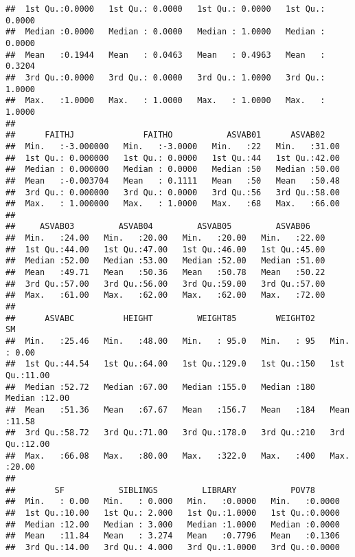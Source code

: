 \documentclass[
]{article}
\begin{document}
\begin{verbatim}
##  1st Qu.:0.0000   1st Qu.: 0.0000   1st Qu.: 0.0000   1st Qu.: 0.0000  
##  Median :0.0000   Median : 0.0000   Median : 1.0000   Median : 0.0000  
##  Mean   :0.1944   Mean   : 0.0463   Mean   : 0.4963   Mean   : 0.3204  
##  3rd Qu.:0.0000   3rd Qu.: 0.0000   3rd Qu.: 1.0000   3rd Qu.: 1.0000  
##  Max.   :1.0000   Max.   : 1.0000   Max.   : 1.0000   Max.   : 1.0000  
##                                                                        
##      FAITHJ              FAITHO           ASVAB01      ASVAB02     
##  Min.   :-3.000000   Min.   :-3.0000   Min.   :22   Min.   :31.00  
##  1st Qu.: 0.000000   1st Qu.: 0.0000   1st Qu.:44   1st Qu.:42.00  
##  Median : 0.000000   Median : 0.0000   Median :50   Median :50.00  
##  Mean   :-0.003704   Mean   : 0.1111   Mean   :50   Mean   :50.48  
##  3rd Qu.: 0.000000   3rd Qu.: 0.0000   3rd Qu.:56   3rd Qu.:58.00  
##  Max.   : 1.000000   Max.   : 1.0000   Max.   :68   Max.   :66.00  
##                                                                    
##     ASVAB03         ASVAB04         ASVAB05         ASVAB06     
##  Min.   :24.00   Min.   :20.00   Min.   :20.00   Min.   :22.00  
##  1st Qu.:44.00   1st Qu.:47.00   1st Qu.:46.00   1st Qu.:45.00  
##  Median :52.00   Median :53.00   Median :52.00   Median :51.00  
##  Mean   :49.71   Mean   :50.36   Mean   :50.78   Mean   :50.22  
##  3rd Qu.:57.00   3rd Qu.:56.00   3rd Qu.:59.00   3rd Qu.:57.00  
##  Max.   :61.00   Max.   :62.00   Max.   :62.00   Max.   :72.00  
##                                                                 
##      ASVABC          HEIGHT         WEIGHT85        WEIGHT02         SM       
##  Min.   :25.46   Min.   :48.00   Min.   : 95.0   Min.   : 95   Min.   : 0.00  
##  1st Qu.:44.54   1st Qu.:64.00   1st Qu.:129.0   1st Qu.:150   1st Qu.:11.00  
##  Median :52.72   Median :67.00   Median :155.0   Median :180   Median :12.00  
##  Mean   :51.36   Mean   :67.67   Mean   :156.7   Mean   :184   Mean   :11.58  
##  3rd Qu.:58.72   3rd Qu.:71.00   3rd Qu.:178.0   3rd Qu.:210   3rd Qu.:12.00  
##  Max.   :66.08   Max.   :80.00   Max.   :322.0   Max.   :400   Max.   :20.00  
##                                                                               
##        SF           SIBLINGS         LIBRARY           POV78       
##  Min.   : 0.00   Min.   : 0.000   Min.   :0.0000   Min.   :0.0000  
##  1st Qu.:10.00   1st Qu.: 2.000   1st Qu.:1.0000   1st Qu.:0.0000  
##  Median :12.00   Median : 3.000   Median :1.0000   Median :0.0000  
##  Mean   :11.84   Mean   : 3.274   Mean   :0.7796   Mean   :0.1306  
##  3rd Qu.:14.00   3rd Qu.: 4.000   3rd Qu.:1.0000   3rd Qu.:0.0000  

\end{verbatim}
\end{document}
